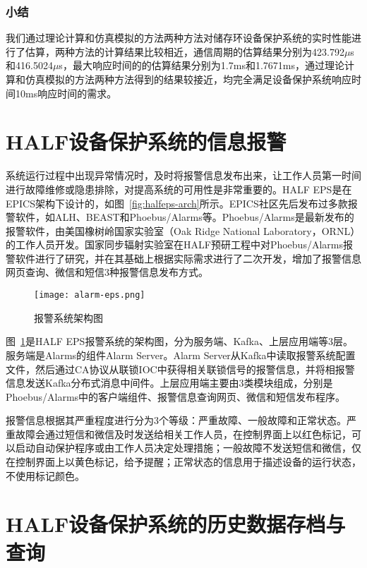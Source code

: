  \subsubsection{小结}

我们通过理论计算和仿真模拟的方法两种方法对储存环设备保护系统的实时性能进行了估算，两种方法的计算结果比较相近，通信周期的估算结果分别为423.792$\mu$s和416.5024$\mu$s，最大响应时间的的估算结果分别为1.7ms和1.7671ms，通过理论计算和仿真模拟的方法两种方法得到的结果较接近，均完全满足设备保护系统响应时间10ms响应时间的需求。

\section{HALF设备保护系统的信息报警}

系统运行过程中出现异常情况时，及时将报警信息发布出来，让工作人员第一时间进行故障维修或隐患排除，对提高系统的可用性是非常重要的。HALF EPS是在EPICS架构下设计的，如图~\ref{fig:halfeps-arch}所示。EPICS社区先后发布过多款报警软件，如ALH、BEAST和Phoebus/Alarms等\cite{alh,Kasemir-2009,Rosati-2017}。Phoebus/Alarms是最新发布的报警软件，由美国橡树岭国家实验室（Oak Ridge National Laboratory，ORNL）的工作人员开发。国家同步辐射实验室在HALF预研工程中对Phoebus/Alarms报警软件进行了研究，并在其基础上根据实际需求进行了二次开发，增加了报警信息网页查询、微信和短信3种报警信息发布方式\cite{chenxin-2019}。

\begin{figure}[!htb]
	\centering
	\texttt{[image: alarm-eps.png]}
	\caption{报警系统架构图}
	\label{fig:alarm-eps}
\end{figure}

图~\ref{fig:alarm-eps}是HALF EPS报警系统的架构图，分为服务端、Kafka、上层应用端等3层。服务端是Alarms的组件Alarm Server。Alarm Server从Kafka中读取报警系统配置文件，然后通过CA协议从联锁IOC中获得相关联锁信号的报警信息，并将相报警信息发送Kafka分布式消息中间件。上层应用端主要由3类模块组成，分别是Phoebus/Alarms中的客户端组件、报警信息查询网页、微信和短信发布程序。

报警信息根据其严重程度进行分为3个等级：严重故障、一般故障和正常状态。严重故障会通过短信和微信及时发送给相关工作人员，在控制界面上以红色标记，可以启动自动保护程序或由工作人员决定处理措施；一般故障不发送短信和微信，仅在控制界面上以黄色标记，给予提醒；正常状态的信息用于描述设备的运行状态，不使用标记颜色。

\section{HALF设备保护系统的历史数据存档与查询}

